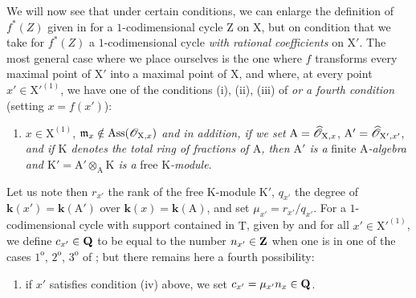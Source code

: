 \begin{env}[21.10.10]
\label{IV.21.10.10}
We will now see that under certain conditions, we can enlarge the definition of $f^*(Z)$ given in  for a $1$-codimensional cycle $\mathrm{Z}$ on $\mathrm{X}$, but on condition that we take for $f^*(Z)$ a $1$-codimensional cycle \emph{with rational coefficients} on $\mathrm{X}'$.
The most general case where we place ourselves is the one where $f$ transforms every maximal point of $\mathrm{X}'$ into a maximal point of $\mathrm{X}$, and where, at every point $x'\in\mathrm{X}'^{(1)}$, we have one of the conditions (i), (ii), (iii) of  \emph{or a fourth condition} (setting $x=f(x')$):
\begin{enumerate}
  \item[(iv)] $x\in\mathrm{X}^{(1)}$, $\mathfrak{m}_{x}\notin\operatorname{Ass}(\mathscr{O}_{\mathrm{X},x})$ \emph{and in addition, if we set} $\mathrm{A}=\widehat{\mathscr{O}}_{\mathrm{X},x}$, $\mathrm{A}'=\widehat{\mathscr{O}}_{\mathrm{X}',x'}$, \emph{and if $\mathrm{K}$ denotes the total ring of fractions of $\mathrm{A}$, then $\mathrm{A}'$ is a} finite \emph{$\mathrm{A}$-algebra and $\mathrm{K}'=\mathrm{A}'\otimes_{\mathrm{A}}\mathrm{K}$ is a} free \emph{$\mathrm{K}$-module}.
\end{enumerate}

Let us note then $r_{x'}$ the rank of the free $\mathrm{K}$-module $\mathrm{K}'$, $q_{x'}$ the degree of $\boldsymbol{k}(x')=\boldsymbol{k}(\mathrm{A}')$ over $\boldsymbol{k}(x)=\boldsymbol{k}(\mathrm{A})$, and set $\mu_{x'}=r_{x'}/q_{x'}$.
For a $1$-codimensional cycle with support contained in $\mathrm{T}$, given by  and for all $x'\in\mathrm{X}'^{(1)}$, we define $c_{x'}\in\mathbf{Q}$ to be equal to the number $n_{x'}\in\mathbf{Z}$ when one is in one of the cases $1^{\mathrm{o}}$, $2^{\mathrm{o}}$, $3^{\mathrm{o}}$ of ; but there remains here a fourth possibility:
\begin{enumerate}
  \item[$4^{\mathrm{o}}$] if $x'$ satisfies condition (iv) above, we set $c_{x'}=\mu_{x'}n_x\in\mathbf{Q}$.
\end{enumerate}
\end{env}

